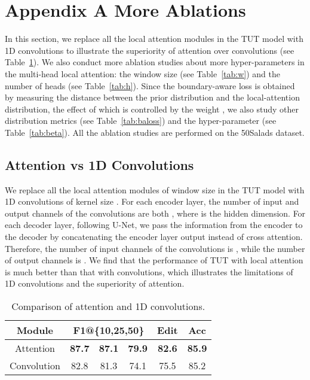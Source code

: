 \documentclass[letterpaper]{article} \usepackage[submission]{aaai23}  \usepackage{times}  \usepackage{helvet}  \usepackage{courier}  \usepackage[hyphens]{url}  \usepackage{graphicx} \urlstyle{rm} \def\UrlFont{\rm}  \usepackage{natbib}  \usepackage{caption} \frenchspacing  \setlength{\pdfpagewidth}{8.5in} \setlength{\pdfpageheight}{11in} \usepackage{algorithm}
\begin{document}
\appendix






\clearpage
\appendix

\section{Appendix A More Ablations}
In this section, we replace all the local attention modules in the TUT model with 1D convolutions to illustrate the superiority of attention over convolutions (see Table~\ref{tab:conv}). We also conduct more ablation studies about more hyper-parameters in the multi-head local attention: the window size  (see Table~\ref{tab:w}) and the number of heads  (see Table~\ref{tab:h}). Since the boundary-aware loss is obtained by measuring the distance between the prior distribution and the local-attention distribution, the effect of which is controlled by the weight , we also study other distribution metrics (see Table~\ref{tab:baloss}) and the hyper-parameter  (see Table~\ref{tab:beta}). All the ablation studies are performed on the
50Salads dataset.

\subsection{Attention vs 1D Convolutions}
We replace all the local attention modules of window size  in the TUT model with 1D convolutions of kernel size . For each encoder layer, the number of input and output channels of the convolutions are both , where  is the hidden dimension. For each decoder layer, following U-Net, we pass the information from the encoder to the decoder by concatenating the encoder layer output instead of cross attention. Therefore, the number of input channels of the convolutions is , while the number of output channels is . We find that the performance of TUT with local attention is much better than that with convolutions, which illustrates the limitations of 1D convolutions and the superiority of attention.


\begin{table}[ht]
\centering
\begin{tabular}{cccccc}
    \toprule
    Module   & \multicolumn{3}{c}{F1@\{10,25,50\}} & Edit & Acc\\
    \midrule
    Attention & \textbf{87.7} & \textbf{87.1} & \textbf{79.9} & \textbf{82.6} & \textbf{85.9}\\
    Convolution & 82.8 & 81.3 & 74.1 & 75.5 & 85.2\\
    \bottomrule
\end{tabular}
\caption{Comparison of attention and 1D convolutions.}
\label{tab:conv}
\end{table}
\end{document}
